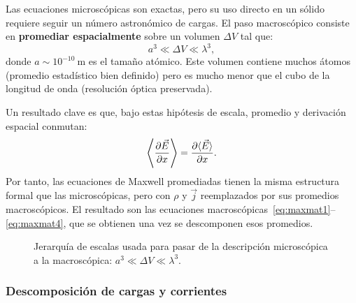 \documentclass[12pt, a4paper]{article}
\theoremstyle{plain}
\theoremstyle{definition}
\theoremstyle{remark}
\newcommand{\ve}[1]{\vec{#1}}
\begin{document}
Las ecuaciones microscópicas son exactas, pero su uso directo en un sólido
requiere seguir un número astronómico de cargas. El paso macroscópico consiste
en \textbf{promediar espacialmente} sobre un volumen $\Delta V$ tal que:
\[
  a^3 \ll \Delta V \ll \lambda^3,
\]
donde $a \sim 10^{-10}\ \mathrm{m}$ es el tamaño atómico. Este volumen
contiene muchos átomos (promedio estadístico bien definido) pero es mucho
menor que el cubo de la longitud de onda (resolución óptica preservada).

Un resultado clave es que, bajo estas hipótesis de escala, promedio y
derivación espacial conmutan:
\begin{equation}
  \left\langle \pdv{\ve{E}}{x}\right\rangle
  = \pdv{\langle\ve{E}\rangle}{x}. \label{eq:conmuta}
\end{equation}
Por tanto, las ecuaciones de Maxwell promediadas tienen la misma estructura
formal que las microscópicas, pero con $\rho$ y $\ve{j}$ reemplazados por
sus promedios macroscópicos. El resultado son las ecuaciones
macroscópicas~\eqref{eq:maxmat1}--\eqref{eq:maxmat4}, que se obtienen una
vez se descomponen esos promedios.

\begin{figure}[H]
  \centering
  \caption{Jerarquía de escalas usada para pasar de la descripción
           microscópica a la macroscópica: $a^3 \ll \Delta V \ll \lambda^3$.}
  \label{fig:escalas_promedio}
\end{figure}

\subsubsection{Descomposición de cargas y corrientes}
\end{document}

